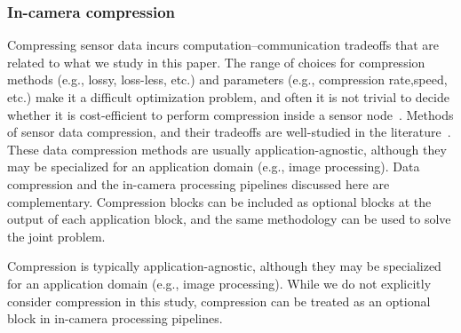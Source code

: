 \subsubsection{In-camera compression}\label{sec:compression-related-work}
Compressing sensor data incurs computation--communication tradeoffs that are related to what we study in this paper. 
The range of choices for compression methods (e.g., lossy, loss-less, etc.) and parameters (e.g., compression rate,speed, etc.) make it a difficult optimization problem, and often it is not trivial to decide whether it is cost-efficient to perform compression inside a sensor node~\cite{zordan-compression}. 
Methods of sensor data compression, and their tradeoffs are well-studied in the literature~\cite{vanderbyl-compression}. 
These data compression methods are usually application-agnostic, although they may be specialized for an application domain (e.g., image processing). 
Data compression and the in-camera processing pipelines discussed here are complementary. Compression blocks can be included as optional blocks at the output of each application block, and the same methodology can be used to solve the joint problem.


Compression is typically application-agnostic, although they may be specialized for an application domain (e.g., image processing).
While we do not explicitly consider compression in this study, compression can be treated as an optional block in in-camera processing pipelines.


